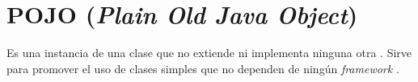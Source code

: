 \section{POJO (\textit{Plain Old Java Object})}

Es una instancia de una clase que no extiende ni implementa ninguna otra \cite{POJO0}. Sirve para promover el uso de clases simples que no dependen de ningún \textit{framework} \cite{POJO1}.